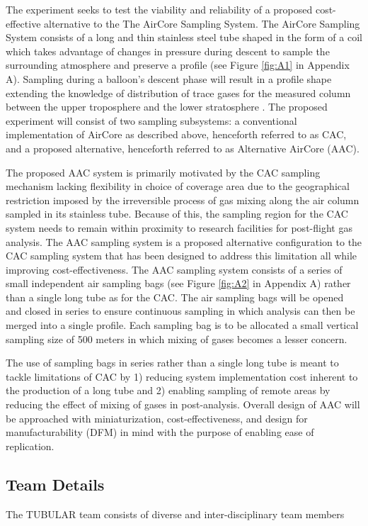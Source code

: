 \documentclass[a4paper,12pt,twoside]{article}
\begin{document}
The experiment seeks to test the viability and reliability of a proposed cost-effective alternative to the The AirCore Sampling System. The AirCore Sampling System consists of a long and thin stainless steel tube shaped in the form of a coil which takes advantage of changes in pressure during descent to sample the surrounding atmosphere and preserve a profile (see Figure \ref{fig:A1} in Appendix A). Sampling during a balloon’s descent phase will result in a profile shape extending the knowledge of distribution of trace gases for the measured column between the upper troposphere and the lower stratosphere \cite{Karion}. The proposed experiment will consist of two sampling subsystems: a conventional implementation of AirCore as described above, henceforth referred to as CAC, and a proposed alternative, henceforth referred to as Alternative AirCore (AAC).

The proposed AAC system is primarily motivated by the CAC sampling mechanism lacking flexibility in choice of coverage area due to the geographical restriction imposed by the irreversible process of gas mixing along the air column sampled in its stainless tube. Because of this, the sampling region for the CAC system needs to remain within proximity to research facilities for post-flight gas analysis. The AAC sampling system is a proposed alternative configuration to the CAC sampling system that has been designed to address this limitation all while improving cost-effectiveness. The AAC sampling system consists of a series of small independent air sampling bags (see Figure \ref{fig:A2} in Appendix A) rather than a single long tube as for the CAC. The air sampling bags will be opened and closed in series to ensure continuous sampling in which analysis can then be merged into a single profile. Each sampling bag is to be allocated a small vertical sampling size of 500 meters in which mixing of gases becomes a lesser concern.

The use of sampling bags in series rather than a single long tube is meant to tackle limitations of CAC by 1) reducing system implementation cost inherent to the production of a long tube and 2) enabling sampling of remote areas by reducing the effect of mixing of gases in post-analysis. Overall design of AAC will be approached with miniaturization, cost-effectiveness, and design for manufacturability (DFM) in mind with the purpose of enabling ease of replication.
\pagebreak
\subsection{Team Details}
The TUBULAR team consists of diverse and inter-disciplinary team members 
\end{document}
